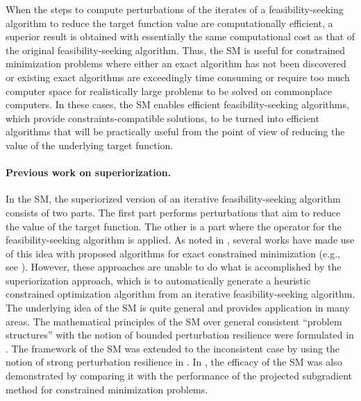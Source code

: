 \documentclass[smallextended]{svjour3}      %
\begin{document}
When the steps to compute perturbations of the iterates of a feasibility-seeking algorithm to reduce the target function value are computationally efficient, a superior result is obtained with essentially the same computational cost as that of the original feasibility-seeking algorithm. Thus, the SM is useful for constrained minimization problems where either an exact algorithm has not been discovered or existing exact algorithms are exceedingly time consuming or require too much computer space for realistically large problems to be solved on commonplace computers. In these cases, the SM enables efficient feasibility-seeking algorithms, which provide constraints-compatible solutions, to be turned into efficient algorithms that will be practically useful from the point of view of reducing the value of the underlying target function.

\paragraph{\textbf{Previous work on superiorization}.}
In the SM, the superiorized version of an iterative feasibility-seeking algorithm consists of two parts. The first part performs perturbations that aim to reduce the value of the target function. The other is a part where the operator for the feasibility-seeking algorithm is applied. As noted in \cite{censor2014projectedsubgrad}, several works have made use of this idea with proposed algorithms for exact constrained minimization (e.g., see \cite{neto2009incremental,neto2011perturbed,defrise2011algorithm,sidky2011constrained,sidky2008image,bian2010evaluation,nurminski2010envelope,combettes2002adaptive,combettes2004image}). However, these approaches are unable to do what is accomplished by the superiorization approach, which is to automatically generate a heuristic constrained optimization algorithm from an iterative feasibility-seeking algorithm. The underlying idea of the SM is quite general and provides application in many areas. The mathematical principles of the SM over general consistent ``problem structures'' with the notion of bounded perturbation resilience were formulated in \cite{censor2010perturbation}. The framework of the SM was extended to the inconsistent case by using the notion of strong perturbation resilience in \cite{censor2014projectedsubgrad,censor2015weakstrong}. In \cite{censor2014projectedsubgrad}, the efficacy of the SM was also demonstrated by comparing it with the performance of the projected subgradient method for constrained minimization problems.
\end{document}
